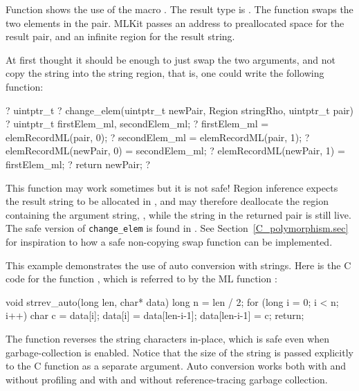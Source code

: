 \documentclass[12pt]{book}
\begin{document}
\begin{example}\label{change_elem.ex}
  Function  shows the
  use of the macro . The result type is . The
  function swaps the two elements in the pair. MLKit passes an address to
  preallocated space for the result pair, and an infinite region for the result
  string.

  At first thought it should be enough to just swap the two arguments, and not
  copy the string into the string region, that is, one could write the following
  function:
\begin{scriptcode}
?  uintptr_t
?  change_elem(uintptr_t newPair, Region stringRho, uintptr_t pair) {
?    uintptr_t firstElem_ml, secondElem_ml;
?    firstElem_ml = elemRecordML(pair, 0);
?    secondElem_ml = elemRecordML(pair, 1);
?    elemRecordML(newPair, 0) = secondElem_ml;
?    elemRecordML(newPair, 1) = firstElem_ml;
?    return newPair;
?  }
\end{scriptcode}
  This function may work sometimes but it is not safe! Region inference expects
  the result string to be allocated in , and may therefore
  deallocate the region containing the argument string, ,
  while the string in the returned pair is still live. The safe version of
  \verb|change_elem| is found in . See
  Section~\ref{C_polymorphism.sec} for inspiration to how a safe non-copying
  swap function can be implemented.
\end{example}

\begin{example}\label{strrev.ex}
  This example demonstrates the use of auto conversion with strings.  Here is
  the C code for the function , which is referred to by the ML
  function
  :
\begin{scriptcode}
  void
  strrev_auto(long len, char* data) {
    long n = len / 2;
    for (long i = 0; i < n; i++) {
      char c = data[i];
      data[i] = data[len-i-1];
      data[len-i-1] = c;
    }
    return;
  }
\end{scriptcode}
The function reverses the string characters in-place, which is safe even when
garbage-collection is enabled. Notice that the size of the string is passed
explicitly to the C function as a separate argument. Auto conversion works both
with and without profiling and with and without reference-tracing garbage
collection.
\end{example}
\end{document}
